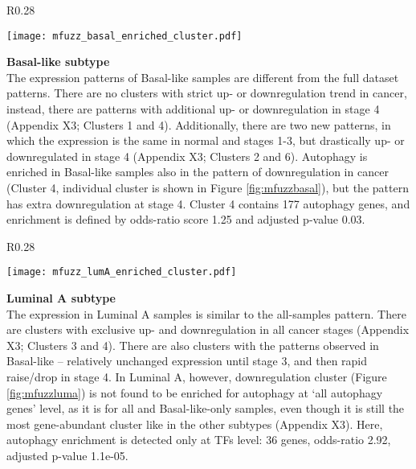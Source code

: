         
        \begin{wrapfigure}{R}{0.28\textwidth}
        \hfill
        \captionsetup{justification=centering}
        \centerline{ \texttt{[image: mfuzz\_basal\_enriched\_cluster.pdf]}}
        \vspace*{-8mm}
        \caption[Basal-like subtype downregulation cluster]{\label{fig:mfuzzbasal}Basal-like\newline downregulation cluster}
        \end{wrapfigure}

        
        \textbf{Basal-like subtype}\\
        The expression patterns of Basal-like samples are different from the full dataset patterns. There are no clusters with strict up- or downregulation trend in cancer, instead, there are patterns with additional up- or downregulation in stage 4 (Appendix X3; Clusters 1 and 4). Additionally, there are two new patterns, in which the expression is the same in normal and stages 1-3, but drastically up- or downregulated in stage 4 (Appendix X3; Clusters 2 and 6).  
        Autophagy is enriched in Basal-like samples also in the pattern of downregulation in cancer (Cluster 4, individual cluster is shown in Figure \ref{fig:mfuzzbasal}), but the pattern has extra downregulation at stage 4. Cluster 4 contains 177 autophagy genes, and enrichment is defined by odds-ratio score 1.25 and adjusted p-value 0.03. 
        
        
        \begin{wrapfigure}{R}{0.28\textwidth}
        \hfill
        \captionsetup{justification=centering}
        \centerline{ \texttt{[image: mfuzz\_lumA\_enriched\_cluster.pdf]}}
        \vspace*{-8mm}
        \caption[Luminal A subtype downregulation cluster]{\label{fig:mfuzzluma}Luminal A \newline downregulation cluster}
        \end{wrapfigure}
        
        
        \textbf{Luminal A subtype}\\   
        The expression in Luminal A samples is similar to the all-samples pattern. There are clusters with exclusive up- and downregulation in all cancer stages (Appendix X3; Clusters 3 and 4). There are also clusters with the patterns observed in Basal-like -- relatively unchanged expression until stage 3, and then rapid raise/drop in stage 4. In Luminal A, however, downregulation cluster (Figure \ref{fig:mfuzzluma}) is not found to be enriched for autophagy at ‘all autophagy genes' level, as it is for all and Basal-like-only samples, even though it is still the most gene-abundant cluster like in the other subtypes (Appendix X3). Here, autophagy enrichment is detected only at TFs level: 36 genes, odds-ratio 2.92, adjusted p-value 1.1e-05.\vspace{5mm} \break
        
